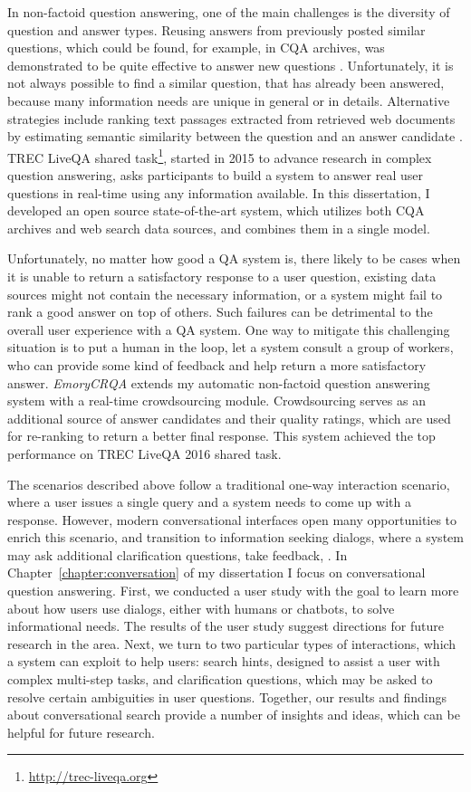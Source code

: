 In non-factoid question answering, one of the main challenges is the diversity of question and answer types.
Reusing answers from previously posted similar questions, which could be found, for example, in CQA archives, was demonstrated to be quite effective to answer new questions \cite{carmel2000eresponder,Shtok:2012:LPA:2187836.2187939}.
Unfortunately, it is not always possible to find a similar question, that has already been answered, because many information needs are unique in general or in details.
Alternative strategies include ranking text passages extracted from retrieved web documents by estimating semantic similarity between the question and an answer candidate \cite{soricut2006automatic}.
TREC LiveQA shared task\footnote{\href{url}{http://trec-liveqa.org}}, started in 2015 to advance research in complex question answering, asks participants to build a system to answer real user questions in real-time using any information available.
In this dissertation, I developed an open source state-of-the-art system, which utilizes both CQA archives and web search data sources, and combines them in a single model.

Unfortunately, no matter how good a QA system is, there likely to be cases when it is unable to return a satisfactory response to a user question, \eg existing data sources might not contain the necessary information, or a system might fail to rank a good answer on top of others.
Such failures can be detrimental to the overall user experience with a QA system.
One way to mitigate this challenging situation is to put a human in the loop, \eg let a system consult a group of workers, who can provide some kind of feedback and help return a more satisfactory answer.
\textit{EmoryCRQA} extends my automatic non-factoid question answering system with a real-time crowdsourcing module.
Crowdsourcing serves as an additional source of answer candidates and their quality ratings, which are used for re-ranking to return a better final response.
This system achieved the top performance on TREC LiveQA 2016 shared task.

The scenarios described above follow a traditional one-way interaction scenario, where a user issues a single query and a system needs to come up with a response.
However, modern conversational interfaces open many opportunities to enrich this scenario, and transition to information seeking dialogs, where a system may ask additional clarification questions, take feedback, \etc.
In Chapter~\ref{chapter:conversation} of my dissertation I focus on conversational question answering.
First, we conducted a user study with the goal to learn more about how users use dialogs, either with humans or chatbots, to solve informational needs.
The results of the user study suggest directions for future research in the area.
Next, we turn to two particular types of interactions, which a system can exploit to help users: search hints, designed to assist a user with complex multi-step tasks, and clarification questions, which may be asked to resolve certain ambiguities in user questions.
Together, our results and findings about conversational search provide a number of insights and ideas, which can be helpful for future research.

